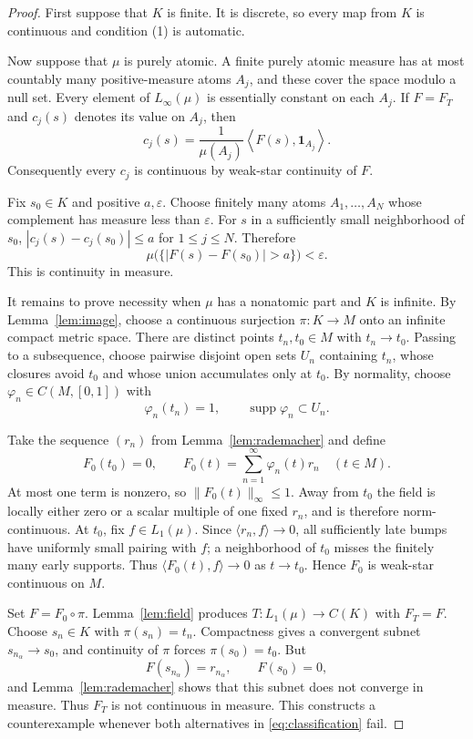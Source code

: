 \documentclass[11pt]{article}
\newcommand{\Linfty}{L_\infty(\mu)}
\newcommand{\Lone}{L_1(\mu)}
\begin{document}
\begin{proof}
First suppose that $K$ is finite.  It is discrete, so every map from $K$ is
continuous and condition (1) is automatic.

Now suppose that $\mu$ is purely atomic.  A finite purely atomic measure has
at most countably many positive-measure atoms $A_j$, and these cover the
space modulo a null set.  Every element of $\Linfty$ is essentially constant
on each $A_j$.  If $F=F_T$ and $c_j(s)$ denotes its value on $A_j$, then
\[
 c_j(s)=\frac1{\mu(A_j)}
 \left\langle F(s),\mathbf 1_{A_j}\right\rangle.
\]
Consequently every $c_j$ is continuous by weak-star continuity of $F$.

Fix $s_0\in K$ and positive $a,\varepsilon$.  Choose finitely many atoms
$A_1,\dots,A_N$ whose complement has measure less than $\varepsilon$.
For $s$ in a sufficiently small neighborhood of $s_0$,
$|c_j(s)-c_j(s_0)|\le a$ for $1\le j\le N$.  Therefore
\[
 \mu\bigl(\{|F(s)-F(s_0)|>a\}\bigr)<\varepsilon.
\]
This is continuity in measure.

It remains to prove necessity when $\mu$ has a nonatomic part and $K$ is
infinite.  By Lemma~\ref{lem:image}, choose a continuous surjection
$\pi:K\to M$ onto an infinite compact metric space.  There are distinct
points $t_n,t_0\in M$ with $t_n\to t_0$.  Passing to a subsequence, choose
pairwise disjoint open sets $U_n$ containing $t_n$, whose closures avoid
$t_0$ and whose union accumulates only at $t_0$.  By normality, choose
$\varphi_n\in C(M,[0,1])$ with
\[
\varphi_n(t_n)=1,\qquad
 \operatorname{supp}\varphi_n\subset U_n.
\]

Take the sequence $(r_n)$ from Lemma~\ref{lem:rademacher} and define
\[
 F_0(t_0)=0,\qquad
 F_0(t)=\sum_{n=1}^\infty \varphi_n(t)r_n\quad(t\in M).
\]
At most one term is nonzero, so $\|F_0(t)\|_\infty\le1$.  Away from $t_0$
the field is locally either zero or a scalar multiple of one fixed $r_n$,
and is therefore norm-continuous.  At $t_0$, fix $f\in\Lone$.  Since
$\langle r_n,f\rangle\to0$, all sufficiently late bumps have uniformly
small pairing with $f$; a neighborhood of $t_0$ misses the finitely many
early supports.  Thus
$\langle F_0(t),f\rangle\to0$ as $t\to t_0$.  Hence $F_0$ is weak-star
continuous on $M$.

Set $F=F_0\circ\pi$.  Lemma~\ref{lem:field} produces
$T:\Lone\to C(K)$ with $F_T=F$.  Choose $s_n\in K$ with
$\pi(s_n)=t_n$.  Compactness gives a convergent subnet
$s_{n_\alpha}\to s_0$, and continuity of $\pi$ forces
$\pi(s_0)=t_0$.  But
\[
 F(s_{n_\alpha})=r_{n_\alpha},\qquad F(s_0)=0,
\]
and Lemma~\ref{lem:rademacher} shows that this subnet does not converge in
measure.  Thus $F_T$ is not continuous in measure.  This constructs a
counterexample whenever both alternatives in \eqref{eq:classification}
fail.
\end{proof}
\end{document}

